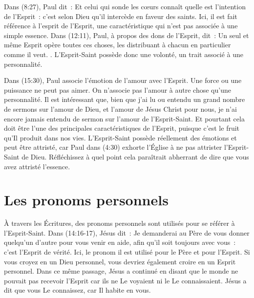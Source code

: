 Dans (8:27), Paul dit~: \og Et celui qui sonde les cœurs connaît quelle est l'intention de l'Esprit~: c'est selon Dieu qu'il intercède en faveur des saints. \fg{} Ici, il est fait référence à l'esprit  de l'Esprit, une caractéristique qui n'est pas associée à une simple essence. Dans (12:11), Paul, à propos des dons de l'Esprit, dit~: \og Un seul et même Esprit opère toutes ces choses, les distribuant à chacun en particulier comme il veut. \fg{}. L'Esprit-Saint possède donc une volonté, un trait associé à une personnalité.

Dans (15:30), Paul associe l'émotion de l'amour avec l'Esprit. Une force ou une puissance ne peut pas aimer. On n'associe pas l'amour à autre chose qu'une personnalité. Il est intéressant que, bien que j'ai lu ou entendu un grand nombre de sermons sur l'amour de Dieu, et l'amour de Jésus Christ pour nous, je n'ai encore jamais entendu de sermon sur l'amour de l'Esprit-Saint. Et pourtant cela doit être l'une des principales caractéristiques de l'Esprit, puisque c'est le fruit qu'Il produit dans nos vies. L'Esprit-Saint possède réellement des émotions et peut être attristé, car Paul dans (4:30) exhorte l'Église à ne pas attrister l'Esprit-Saint de Dieu. Réfléchissez à quel point cela paraîtrait abherrant de dire que vous avez attristé l'essence.


\section{Les pronoms personnels}

À travers les Écritures, des pronoms personnels sont utilisés pour se référer à l'Esprit-Saint. Dans (14:16-17), Jésus dit~: \og Je demanderai au Père de vous donner quelqu'un d'autre pour vous venir en aide, afin qu'il soit toujours avec vous~: c'est l'Esprit de vérité. \fg{} Ici, le pronom \og il \fg{} est utilisé pour le Père et pour l'Esprit. Si vous croyez en un Dieu personnel, vous devriez également croire en un Esprit personnel. Dans ce même passage, Jésus a continué en disant que le monde ne pouvait pas recevoir l'Esprit car ils ne Le voyaient ni le Le connaissaient. Jésus a dit que vous Le connaissez, car Il habite en vous.

